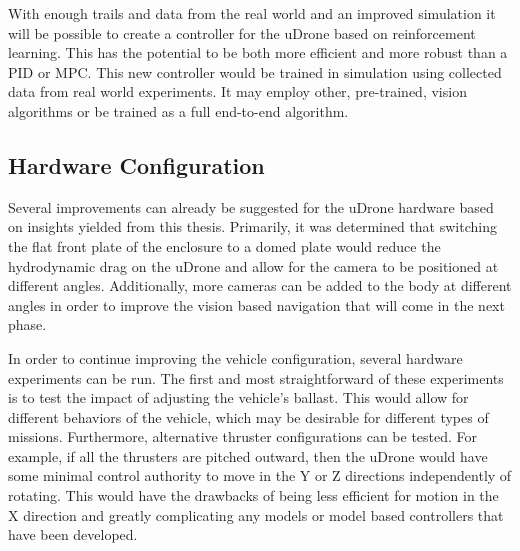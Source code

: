 With enough trails and data from the real world and an improved simulation it will be possible to create a controller for the uDrone based on reinforcement learning. This has the potential to be both more efficient and more robust than a PID or MPC. This new controller would be trained in simulation using collected data from real world experiments. It may employ other, pre-trained, vision algorithms or be trained as a full end-to-end algorithm. 

\subsection{Hardware Configuration}

Several improvements can already be suggested for the uDrone hardware based on insights yielded from this thesis. Primarily, it was determined that switching the flat front plate of the enclosure to a domed plate would reduce the hydrodynamic drag on the uDrone and allow for the camera to be positioned at different angles. Additionally, more cameras can be added to the body at different angles in order to improve the vision based navigation that will come in the next phase.

In order to continue improving the vehicle configuration, several hardware experiments can be run. The first and most straightforward of these experiments is to test the impact of adjusting the vehicle's ballast. This would allow for different behaviors of the vehicle, which may be desirable for different types of missions. Furthermore, alternative thruster configurations can be tested. For example, if all the thrusters are pitched outward, then the uDrone would have some minimal control authority to move in the Y or Z directions independently of rotating. This would have the drawbacks of being less efficient for motion in the X direction and greatly complicating any models or model based controllers that have been developed. 


